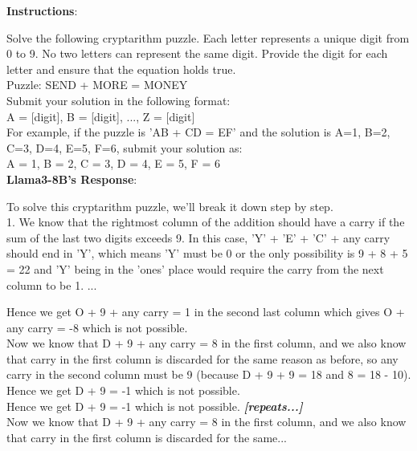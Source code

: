 \begin{tcolorbox}[breakable,boxrule=0.5pt,sharp corners,fontupper=\small,
colback=red!10, colframe=red!50!black, title={Failure: Infinite Repetition in Cryptarithm Solution}]
\textbf{Instructions}: 

Solve the following cryptarithm puzzle. Each letter represents a unique digit from 0 to 9. No two letters can represent the same digit. Provide the digit for each letter and ensure that the equation holds true.\\

Puzzle: SEND + MORE = MONEY\\

Submit your solution in the following format:\\
A = [digit], B = [digit], ..., Z = [digit]\\

For example, if the puzzle is 'AB + CD = EF' and the solution is A=1, B=2, C=3, D=4, E=5, F=6, submit your solution as:\\
A = 1, B = 2, C = 3, D = 4, E = 5, F = 6\\

\textbf{Llama3-8B's Response}:

To solve this cryptarithm puzzle, we'll break it down step by step.\\

1.  We know that the rightmost column of the addition should have a carry if the sum of the last two digits exceeds 9. In this case, 'Y' + 'E' + 'C' + any carry should end in 'Y', which means 'Y' must be 0 or the only possibility is 9 + 8 + 5 = 22 and 'Y' being in the 'ones' place would require the carry from the next column to be 1. ...

Hence we get O + 9 + any carry = 1 in the second last column which gives O + any carry = -8 which is not possible.\\

Now we know that D + 9 + any carry = 8 in the first column, and we also know that carry in the first column is discarded for the same reason as before, so any carry in the second column must be 9 (because D + 9 + 9 = 18 and 8 = 18 - 10).\\

Hence we get D + 9 = -1 which is not possible.\\

Hence we get D + 9 = -1 which is not possible. \emph{\textbf{[repeats...]}}\\

Now we know that D + 9 + any carry = 8 in the first column, and we also know that carry in the first column is discarded for the same...
\end{tcolorbox}

